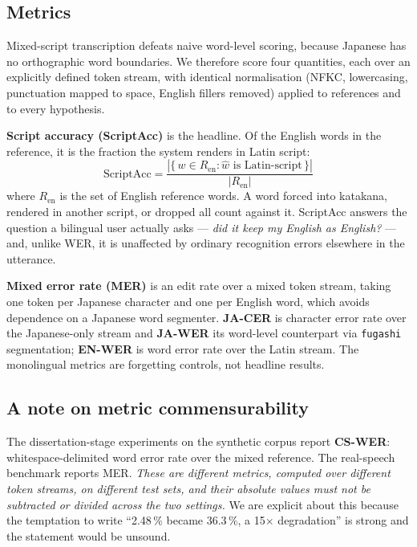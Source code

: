 \documentclass[11pt,a4paper]{article}
\begin{document}
\subsection{Metrics}

Mixed-script transcription defeats naive word-level scoring, because Japanese has
no orthographic word boundaries. We therefore score four quantities, each over an
explicitly defined token stream, with identical normalisation (NFKC, lowercasing,
punctuation mapped to space, English fillers removed) applied to references and to
every hypothesis.

\textbf{Script accuracy (ScriptAcc)} is the headline. Of the English words in the
reference, it is the fraction the system renders in Latin script:
\begin{equation}
\mathrm{ScriptAcc} = \frac{\left|\{\, w \in R_{\mathrm{en}} : \hat{w} \text{ is Latin-script} \,\}\right|}{|R_{\mathrm{en}}|}
\end{equation}
where $R_{\mathrm{en}}$ is the set of English reference words. A word forced into
katakana, rendered in another script, or dropped all count against it. ScriptAcc
answers the question a bilingual user actually asks --- \emph{did it keep my
English as English?} --- and, unlike WER, it is unaffected by ordinary
recognition errors elsewhere in the utterance.

\textbf{Mixed error rate (MER)} is an edit rate over a mixed token stream, taking
one token per Japanese character and one per English word, which avoids dependence
on a Japanese word segmenter. \textbf{JA-CER} is character error rate over the
Japanese-only stream and \textbf{JA-WER} its word-level counterpart via
\texttt{fugashi} segmentation; \textbf{EN-WER} is word error rate over the Latin
stream. The monolingual metrics are forgetting controls, not headline results.

\subsection{A note on metric commensurability}
\label{sec:commensurability}

The dissertation-stage experiments on the synthetic corpus report
\textbf{CS-WER}: whitespace-delimited word error rate over the mixed reference.
The real-speech benchmark reports MER. \emph{These are different metrics, computed
over different token streams, on different test sets, and their absolute values
must not be subtracted or divided across the two settings.} We are explicit about
this because the temptation to write ``\num{2.48}\,\% became \num{36.3}\,\%, a
\num{15}$\times$ degradation'' is strong and the statement would be unsound.
\end{document}
